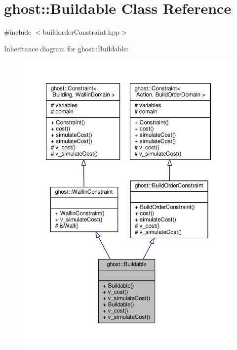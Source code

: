 \hypertarget{classghost_1_1Buildable}{\section{ghost\-:\-:Buildable Class Reference}
\label{classghost_1_1Buildable}
}


{\ttfamily \#include $<$buildorder\-Constraint.\-hpp$>$}



Inheritance diagram for ghost\-:\-:Buildable\-:
\nopagebreak
\begin{figure}[H]
\begin{center}
\leavevmode
\includegraphics[width=350pt]{classghost_1_1Buildable__inherit__graph}
\end{center}
\end{figure}


